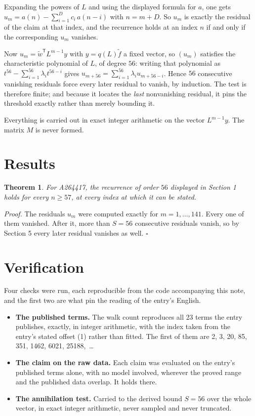 \documentclass[11pt]{article}
\newtheorem{theorem}{Theorem}
\theoremstyle{definition}
\begin{document}
Expanding the powers of $L$ and using the displayed formula for $a$, one gets $u_m = a(n) - \sum_{i=1}^{D} c_i\,a(n-i)$ with $n = m + D$. So $u_m$ is exactly the residual of the claim at that index, and the recurrence holds at an index $n$ if and only if the corresponding $u_m$ vanishes.

Now $u_m = \tilde w^{\mathsf T} L^{m-1} y$ with $y = q(L)\tilde f$ a fixed vector, so $(u_m)$ satisfies the characteristic polynomial of $L$, of degree $56$: writing that polynomial as $t^{56} - \sum_{i=1}^{56} \lambda_i t^{56-i}$ gives $u_{m+56} = \sum_{i=1}^{56} \lambda_i u_{m+56-i}$. Hence $56$ consecutive vanishing residuals force every later residual to vanish, by induction. The test is therefore finite; and because it locates the {\itshape last} nonvanishing residual, it pins the threshold exactly rather than merely bounding it.

Everything is carried out in exact integer arithmetic on the vector $L^{m-1}y$. The matrix $M$ is never formed.

\section{Results}

\begin{theorem} For A264417, the recurrence of order $56$ displayed in Section 1 holds for every $n \ge 57$, at every index at which it can be stated.\end{theorem}

{\itshape Proof.} The residuals $u_m$ were computed exactly for $m = 1,\dots,141$. Every one of them vanished. After it, more than $S = 56$ consecutive residuals vanish, so by Section 5 every later residual vanishes as well. $\square$

\section{Verification}

Four checks were run, each reproducible from the code accompanying this note, and the first two are what pin the reading of the entry's English.

\begin{itemize}

\item {\bfseries The published terms.} The walk count reproduces all 23 terms the entry publishes, exactly, in integer arithmetic, with the index taken from the entry's stated offset (1) rather than fitted. The first of them are 2, 3, 20, 85, 351, 1462, 6021, 25188,~\dots

\item {\bfseries The claim on the raw data.} Each claim was evaluated on the entry's published terms alone, with no model involved, wherever the proved range and the published data overlap. It holds there.

\item {\bfseries The annihilation test.} Carried to the derived bound $S = 56$ over the whole vector, in exact integer arithmetic, never sampled and never truncated.

\end{itemize}
\end{document}

